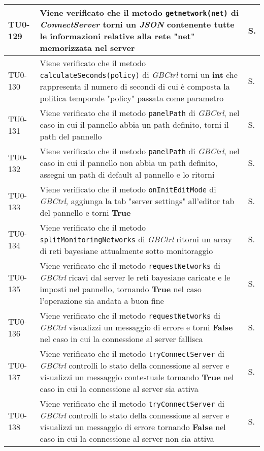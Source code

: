 \begin{longtable}{|C{.15\textwidth}|m{.66\textwidth}|C{.10\textwidth}|}
\hline
{}TU0-129 & Viene verificato che il metodo \texttt{getnetwork(net)} di \textit{ConnectServer} torni un \textit{JSON} contenente tutte le informazioni relative alla rete "net" memorizzata nel server & S.\\
\hline
TU0-130 & Viene verificato che il metodo \texttt{calculateSeconds(policy)} di \textit{GBCtrl} torni un \textbf{int} che rappresenta il numero di secondi di cui è composta la politica temporale "policy" passata come parametro & S.\\
\hline
{}TU0-131 & Viene verificato che il metodo \texttt{panelPath} di \textit{GBCtrl}, nel caso in cui il pannello abbia un path definito, torni il path del pannello & S.\\
\hline
TU0-132 & Viene verificato che il metodo \texttt{panelPath} di \textit{GBCtrl}, nel caso in cui il pannello non abbia un path definito, assegni un path di default al pannello e lo ritorni & S.\\
\hline
{}TU0-133 & Viene verificato che il metodo \texttt{onInitEditMode} di \textit{GBCtrl}, aggiunga la tab "server settings" all'editor tab del pannello e torni \textbf{True} & S.\\
\hline
TU0-134 & Viene verificato che il metodo \texttt{splitMonitoringNetworks} di \textit{GBCtrl} ritorni un array di reti bayesiane attualmente sotto monitoraggio & S.\\
\hline
{}TU0-135 & Viene verificato che il metodo \texttt{requestNetworks} di \textit{GBCtrl} ricavi dal server le reti bayesiane caricate e le imposti nel pannello, tornando \textbf{True} nel caso l'operazione sia andata  a buon fine & S.\\
\hline
TU0-136 & Viene verificato che il metodo \texttt{requestNetworks} di \textit{GBCtrl} visualizzi un messaggio di errore e torni \textbf{False} nel caso in cui la connessione al server fallisca & S.\\
\hline
{}TU0-137 & Viene verificato che il metodo \texttt{tryConnectServer} di \textit{GBCtrl} controlli lo stato della connessione al server e visualizzi un messaggio contestuale tornando \textbf{True} nel caso in cui la connessione al server sia attiva & S.\\
\hline
TU0-138 & Viene verificato che il metodo \texttt{tryConnectServer} di \textit{GBCtrl} controlli lo stato della connessione al server e visualizzi un messaggio di errore tornando \textbf{False} nel caso in cui la connessione al server non sia attiva & S.\\

\end{longtable}
